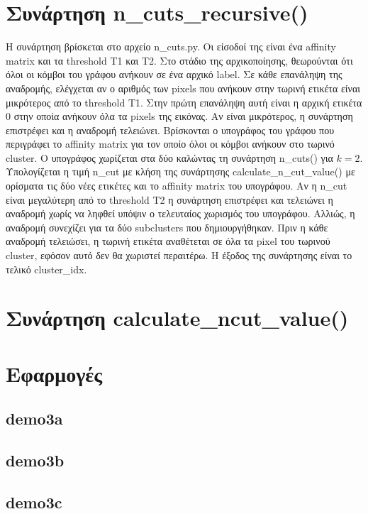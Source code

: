 \documentclass{article}
\begin{document}
\section{Συνάρτηση n\_cuts\_recursive()}
Η συνάρτηση βρίσκεται στο αρχείο n\_cuts.py. Οι είσοδοί της είναι ένα affinity matrix 
και τα threshold T1 και T2. Στο στάδιο της αρχικοποίησης, θεωρούνται ότι όλοι
οι κόμβοι του γράφου ανήκουν σε ένα αρχικό label. Σε κάθε επανάληψη της αναδρομής,
ελέγχεται αν ο αριθμός των pixels που ανήκουν στην τωρινή ετικέτα είναι μικρότερος
από το threshold T1. Στην πρώτη επανάληψη αυτή είναι η αρχική ετικέτα 0 στην οποία 
ανήκουν όλα τα pixels της εικόνας. Αν είναι μικρότερος, η συνάρτηση επιστρέφει 
και η αναδρομή τελειώνει. Βρίσκονται ο υπογράφος του γράφου που περιγράφει το
affinity matrix για τον οποίο όλοι οι κόμβοι ανήκουν στο τωρινό cluster. Ο
υπογράφος χωρίζεται στα δύο καλώντας τη συνάρτηση n\_cuts() για $k=2$. 
Υπολογίζεται η τιμή n\_cut με κλήση της συνάρτησης calculate\_n\_cut\_value()
με ορίσματα τις δύο νέες ετικέτες και το affinity matrix του υπογράφου.
Αν η n\_cut είναι μεγαλύτερη από το threshold T2 η συνάρτηση επιστρέφει και τελειώνει η
αναδρομή χωρίς να ληφθεί υπόψιν ο τελευταίος χωρισμός του υπογράφου. Αλλιώς,
η αναδρομή συνεχίζει για τα δύο subclusters που δημιουργήθηκαν. Πριν η 
κάθε αναδρομή τελειώσει, η τωρινή ετικέτα αναθέτεται σε όλα τα pixel
του τωρινού cluster, εφόσον αυτό δεν θα χωριστεί περαιτέρω. Η έξοδος της
συνάρτησης είναι το τελικό cluster\_idx.

\section{Συνάρτηση calculate\_ncut\_value()}

\section{Εφαρμογές}
\subsection{demo3a} 
\subsection{demo3b}
\subsection{demo3c}
\end{document}
